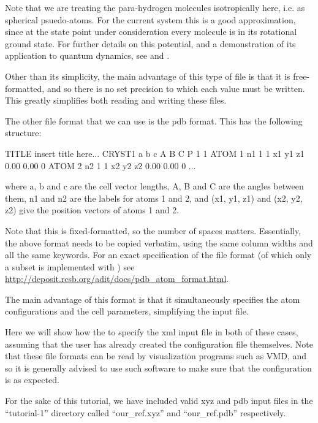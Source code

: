 \documentclass[11pt,english,fleqn]{report}
\newenvironment{code}{%
\footnotesize 
\verbatim
}{
\endverbatim
\normalsize
}
\begin{document}
Note that we are treating the para-hydrogen molecules isotropically here,
i.e. as spherical psuedo-atoms.
For the current system this is a good approximation, since at 
the state point under consideration every molecule is in its 
rotational ground state. For further details on this potential,
and a demonstration of its application to quantum dynamics, see
\cite{silv-gold78jcp} and \cite{mill-mano05jcp}.

Other than its simplicity, the main advantage of this type of file
is that it is free-formatted, and so there is no set precision
to which each value must be written. This greatly simplifies
both reading and writing these files.

The other file format that we can use is the pdb format. This
has the following structure:

\begin{code}
TITLE insert title here...
CRYST1        a        b        c      A      B      C P 1           1
ATOM      1   n1   1     1          x1      y1      z1  0.00  0.00             0
ATOM      2   n2   1     1          x2      y2      z2  0.00  0.00             0
...
\end{code}
where a, b and c are the cell vector lengths, A, B and C are the angles between
them, n1 and n2 are the labels for atoms 1 and 2, and (x1, y1, z1)
and (x2, y2, z2) give the position vectors of atoms 1 and 2. 

Note that this is
fixed-formatted, so the number of spaces matters. Essentially, the
above format needs to be copied verbatim, using the same column
widths and all the same keywords. For an exact specification
of the file format (of which only a subset is implemented 
with \ipi) see
\url{http://deposit.rcsb.org/adit/docs/pdb_atom_format.html}.

The main advantage of this format is that it simultaneously specifies
the atom configurations and the cell parameters, simplifying
the input file.

Here we will show how the to specify the xml input file
in both of these cases, assuming that the user has already
created the configuration file themselves.
Note that these file formats can be read by
visualization programs such as VMD, and so it is generally advised to
use such software to make sure that the configuration is as expected.

For the sake of this tutorial, we have included valid xyz and pdb input
files in the {}``tutorial-1'' directory called {}``our\_ref.xyz''
and {}``our\_ref.pdb'' respectively.
\end{document}

